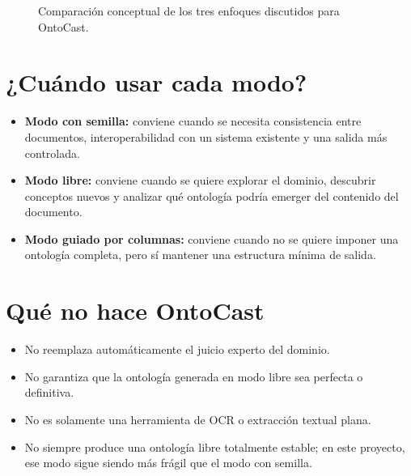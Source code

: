 \documentclass[12pt]{article}
\begin{document}
\begin{figure}[H]
\centering
{}
\caption{Comparación conceptual de los tres enfoques discutidos para OntoCast.}
\label{fig:ontocast-questions}
\end{figure}

\section{¿Cuándo usar cada modo?}

\begin{itemize}
  \item \textbf{Modo con semilla:} conviene cuando se necesita consistencia entre documentos, interoperabilidad con un sistema existente y una salida más controlada.
  \item \textbf{Modo libre:} conviene cuando se quiere explorar el dominio, descubrir conceptos nuevos y analizar qué ontología podría emerger del contenido del documento.
  \item \textbf{Modo guiado por columnas:} conviene cuando no se quiere imponer una ontología completa, pero sí mantener una estructura mínima de salida.
\end{itemize}

\section{Qué no hace OntoCast}

\begin{itemize}
  \item No reemplaza automáticamente el juicio experto del dominio.
  \item No garantiza que la ontología generada en modo libre sea perfecta o definitiva.
  \item No es solamente una herramienta de OCR o extracción textual plana.
  \item No siempre produce una ontología libre totalmente estable; en este proyecto, ese modo sigue siendo más frágil que el modo con semilla.
\end{itemize}
\end{document}
